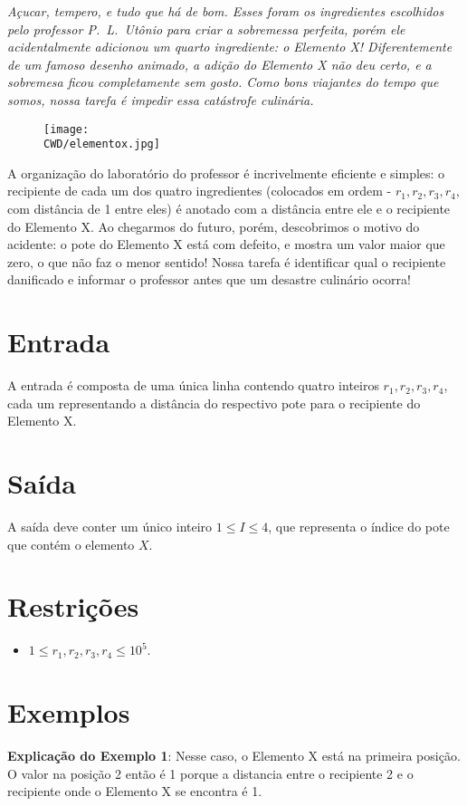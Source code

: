 \begin{center}
\textit{
	Açucar, tempero, e tudo que há de bom. Esses foram os ingredientes escolhidos pelo professor P.~L.~Utônio para criar a sobremessa perfeita,
	porém ele acidentalmente adicionou um quarto ingrediente: o Elemento X! Diferentemente de um famoso desenho animado, a adição do Elemento X não deu certo,
	e a sobremesa ficou completamente sem gosto. Como bons viajantes do tempo que somos, nossa tarefa é impedir essa catástrofe culinária.
  }
\end{center}



\begin{figure}[H]
    \centering
    \texttt{[image: \\CWD/elementox.jpg]}
\end{figure}

A organização do laboratório do professor é incrivelmente eficiente e simples: o recipiente de cada um dos quatro ingredientes (colocados em ordem - $r_1, r_2, r_3, r_4$, com distância de 1 entre eles)
é anotado com a distância entre ele e o recipiente do Elemento X. Ao chegarmos do futuro, porém, descobrimos o motivo do acidente:
o pote do Elemento X está com defeito, e mostra um valor maior que zero, o que não faz o menor sentido!
Nossa tarefa é identificar qual o recipiente danificado e informar o professor antes que um desastre culinário ocorra!

\section*{Entrada}

A entrada é composta de uma única linha contendo quatro inteiros $r_1, r_2, r_3, r_4$, cada um representando a distância do respectivo pote para o recipiente do Elemento X.

\section*{Saída}

A saída deve conter um único inteiro $1 \leq I \leq 4$, que representa o índice do pote que contém o elemento $X$.

\section*{Restrições}

\begin{itemize}
\item $ 1 \leq r_1, r_2, r_3, r_4 \leq 10^5$.
\end{itemize}

\section*{Exemplos}

\exemplo

\bigskip
\textbf{Explicação do Exemplo 1}: Nesse caso, o Elemento X está na primeira posição. O valor na posição 2 então é 1 porque a distancia entre o recipiente 2 e o recipiente onde o Elemento X se encontra é 1.
